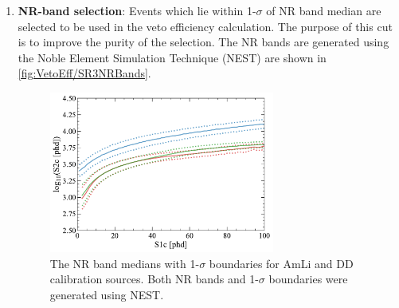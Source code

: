 \begin{enumerate}
	\item \textbf{NR-band selection}: Events which lie within 1-$\sigma$ of NR band median are selected to be used in the veto efficiency calculation. The purpose of this cut is to improve the purity of the selection. The NR bands are generated using the Noble Element Simulation Technique (NEST) \cite{NEST2011} are shown in \autoref{fig:VetoEff/SR3NRBands}.
    \begin{figure}[!ht]
    	\centering
    	\includegraphics[width=0.7\textwidth]{figures/VetoEfficiency/NRBands.pdf}
    	\caption{The NR band medians with 1-$\sigma$ boundaries for AmLi and DD calibration sources. Both NR bands and 1-$\sigma$ boundaries were generated using NEST.}
    	\label{fig:VetoEff/SR3NRBands}
    \end{figure}
\end{enumerate}



